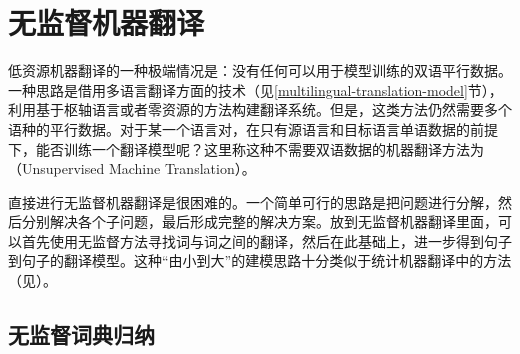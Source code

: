\sectionnewpage
\section{无监督机器翻译}
\label{sec:unsupervised-nmt}

\parinterval 低资源机器翻译的一种极端情况是：没有任何可以用于模型训练的双语平行数据。一种思路是借用多语言翻译方面的技术（见\ref{multilingual-translation-model}节），利用基于枢轴语言或者零资源的方法构建翻译系统。但是，这类方法仍然需要多个语种的平行数据。对于某一个语言对，在只有源语言和目标语言单语数据的前提下，能否训练一个翻译模型呢？这里称这种不需要双语数据的机器翻译方法为{\small{}}（Unsupervised Machine Translation）。

\parinterval 直接进行无监督机器翻译是很困难的。一个简单可行的思路是把问题进行分解，然后分别解决各个子问题，最后形成完整的解决方案。放到无监督机器翻译里面，可以首先使用无监督方法寻找词与词之间的翻译，然后在此基础上，进一步得到句子到句子的翻译模型。这种“由小到大”的建模思路十分类似于统计机器翻译中的方法（见\chapterseven）。



\subsection{无监督词典归纳}\label{unsupervised-dictionary-induction}

